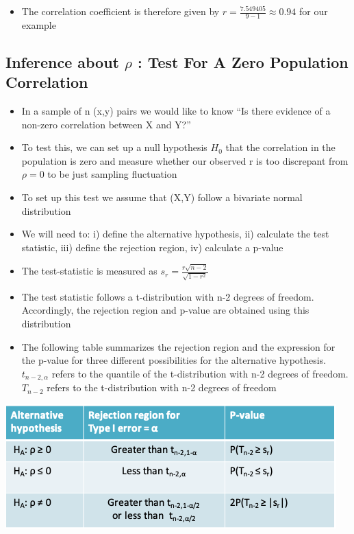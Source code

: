 \documentclass[
]{book}
\providecommand{\tightlist}{%
  \setlength{\itemsep}{0pt}\setlength{\parskip}{0pt}}
\begin{document}
\begin{itemize}
\tightlist
\item
  The correlation coefficient is therefore given by \(r=\frac{7.549405}{9-1}\approx 0.94\) for our example
\end{itemize}

\hypertarget{inference-about-rho-test-for-a-zero-population-correlation}{%
\subsection{\texorpdfstring{Inference about \(\rho\) : Test For A Zero Population Correlation}{Inference about \textbackslash rho : Test For A Zero Population Correlation}}\label{inference-about-rho-test-for-a-zero-population-correlation}}

\begin{itemize}
\tightlist
\item
  In a sample of n (x,y) pairs we would like to know ``Is there evidence of a non-zero correlation between X and Y?''
\item
  To test this, we can set up a null hypothesis \(H_0\) that the correlation in the population is zero and measure whether our observed r is too discrepant from \(\rho=0\) to be just sampling fluctuation
\item
  To set up this test we assume that (X,Y) follow a bivariate normal distribution
\item
  We will need to: i) define the alternative hypothesis, ii) calculate the test statistic, iii) define the rejection region, iv) calculate a p-value
\item
  The test-statistic is measured as \(s_r=\frac{r\sqrt{n-2}}{\sqrt{1-r^2}}\)
\item
  The test statistic follows a t-distribution with n-2 degrees of freedom. Accordingly, the rejection region and p-value are obtained using this distribution
\item
  The following table summarizes the rejection region and the expression for the p-value for three different possibilities for the alternative hypothesis. \(t_{n-2, α}\) refers to the quantile of the t-distribution with n-2 degrees of freedom. \(T_{n-2}\) refers to the t-distribution with n-2 degrees of freedom
\end{itemize}

\includegraphics[width=0.7\linewidth]{./11_47}
\end{document}
